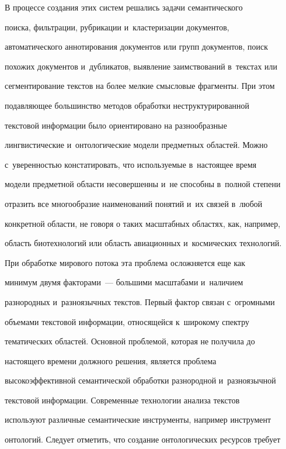      


     В процессе создания этих систем решались задачи семантического 


поиска, фильтрации, рубрикации и~кластеризации документов, 


автоматического аннотирования документов или групп документов, поиск 


похожих документов и~дубликатов, выявление заимствований в~текстах или 


сегментирование текстов на более мелкие смысловые фрагменты. При этом 


подавляющее большинство методов обработки неструктурированной 


текстовой информации было ориентировано на разнообразные 


лингвистические и~онтологические модели предметных областей. Можно 


с~уверенностью констатировать, что используемые в~настоящее время 


модели предметной области несовершенны и~не способны в~полной степени 


отразить все многообразие наименований понятий и~их связей в~любой 


конкретной области, не говоря о таких масштабных областях, как, например, 


область биотехнологий или область авиационных и~космических технологий. 


     


      При обработке мирового потока эта проблема осложняется еще как 


минимум двумя факторами~--- большими масштабами и~наличием 


разнородных и~разноязычных текстов. Первый фактор связан с~огромными 


объемами текстовой информации, относящейся к~широкому спектру 


тематических областей. Основной проблемой, которая не получила до 


настоящего времени должного решения, является проблема 


высокоэффективной семантической обработки разнородной и~разноязычной 


текстовой информации. Современные технологии анализа текстов 


используют различные семантические инструменты, например инструмент 


онтологий. Следует отметить, что создание онтологических ресурсов требует 


